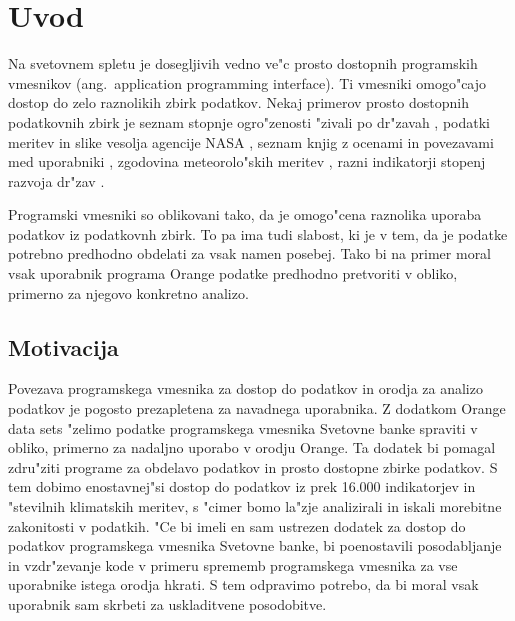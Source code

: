 
\chapter{Uvod}

Na svetovnem spletu je dosegljivih vedno ve"c prosto dostopnih programskih
vmesnikov (ang.\ application programming interface). 
Ti vmesniki omogo"cajo dostop
do zelo raznolikih zbirk podatkov. Nekaj primerov prosto dostopnih podatkovnih
zbirk je seznam stopnje ogro"zenosti "zivali po dr"zavah 
    ,
podatki meritev in slike vesolja agencije NASA
    ,
seznam knjig z ocenami in povezavami med uporabniki 
    ,
zgodovina meteorolo"skih meritev 
    ,
razni indikatorji stopenj razvoja dr"zav
    .

Programski vmesniki so oblikovani tako, da je omogo"cena raznolika uporaba
podatkov iz podatkovnh zbirk. To pa ima tudi slabost, ki je v tem, da je 
podatke potrebno predhodno obdelati za vsak namen posebej. Tako bi na primer 
moral vsak uporabnik programa Orange podatke predhodno pretvoriti v obliko, 
primerno za njegovo konkretno analizo.


\section{Motivacija}


Povezava programskega vmesnika za dostop do podatkov in orodja za analizo 
podatkov je pogosto prezapletena za navadnega uporabnika. Z dodatkom Orange
data sets "zelimo podatke programskega vmesnika Svetovne banke spraviti v 
obliko, primerno za nadaljno
uporabo v orodju Orange. Ta dodatek bi pomagal zdru"ziti programe za obdelavo
podatkov in prosto dostopne zbirke podatkov. S tem dobimo enostavnej"si dostop 
do podatkov iz prek 16.000 indikatorjev in "stevilnih klimatskih meritev,
s "cimer bomo la"zje analizirali in iskali morebitne zakonitosti v podatkih.
"Ce bi imeli en sam ustrezen dodatek za dostop do podatkov programskega 
vmesnika Svetovne banke, bi poenostavili posodabljanje in
vzdr"zevanje kode v primeru sprememb programskega vmesnika za vse uporabnike
istega orodja hkrati. S tem odpravimo potrebo, da bi moral vsak uporabnik sam
skrbeti za uskladitvene posodobitve.


